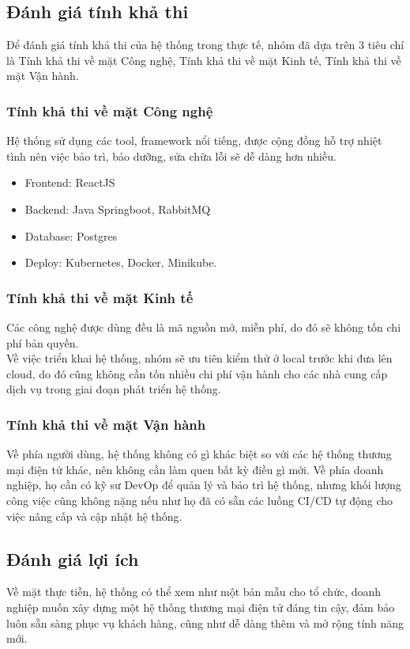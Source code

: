 \subsection{Đánh giá tính khả thi}
\noindent Để đánh giá tính khả thi của hệ thống trong thực tế, nhóm đã dựa trên 3 tiêu chí là Tính khả thi về mặt Công nghệ, Tính khả thi về mặt Kinh tế, Tính khả thi về mặt Vận hành.
\subsubsection{Tính khả thi về mặt Công nghệ}
\noindent Hệ thống sử dụng các tool, framework nổi tiếng, được cộng đồng hỗ trợ nhiệt tình nên việc bảo trì, bảo dưỡng, sửa chữa lỗi sẽ dễ dàng hơn nhiều.
\begin{itemize}
    \item Frontend: ReactJS
    \item Backend: Java Springboot, RabbitMQ
    \item Database: Postgres
    \item Deploy: Kubernetes, Docker, Minikube.
\end{itemize}
\subsubsection{Tính khả thi về mặt Kinh tế}
\noindent Các công nghệ được dùng đều là mã nguồn mở, miễn phí, do đó sẽ không tốn chi phí bản quyền.\\[0.5cm]
Về việc triển khai hệ thống, nhóm sẽ ưu tiên kiểm thử ở local trước khi đưa lên cloud, do đó cũng không cần tốn nhiều chi phí vận hành cho các nhà cung cấp dịch vụ trong giai đoạn phát triển hệ thống.
\subsubsection{Tính khả thi về mặt Vận hành}
\noindent Về phía người dùng, hệ thống không có gì khác biệt so với các hệ thống thương mại điện tử khác, nên không cần làm quen bất kỳ điều gì mới. Về phía doanh nghiệp, họ cần có kỹ sư DevOp để quản lý và bảo trì hệ thống, nhưng khối lượng công việc cũng không nặng nếu như họ đã có sẵn các luồng CI/CD tự động cho việc nâng cấp và cập nhật hệ thống.
\subsection{Đánh giá lợi ích}
\noindent Về mặt thực tiễn, hệ thống có thể xem như một bản mẫu cho tổ chức, doanh nghiệp muốn xây dựng một hệ thống thương mại điện tử đáng tin cậy, đảm bảo luôn sẵn sàng phục vụ khách hàng, cũng như dễ dàng thêm và mở rộng tính năng mới.
